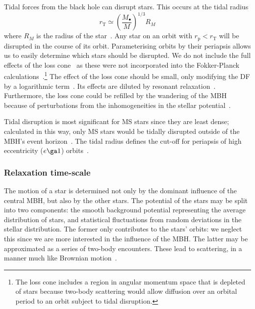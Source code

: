 \documentclass[useAMS,usedcolumn,usegraphicx,usenatbib]{mn2e}
\newcommand{\sub}[1]{\ensuremath{_\mathrm{#1}}}
\begin{document}
Tidal forces from the black hole can disrupt stars. This occurs at the tidal radius
\begin{equation}
r\sub{T} \simeq \left(\frac{M_\bullet}{M}\right)^{1/3}R_M
\label{eq:Tidal}
\end{equation}
where $R_M$ is the radius of the star~\citep{Hills1975, Rees1988, Kobayashi2004}. Any star on an orbit with $r\sub{p} < r\sub{T}$ will be disrupted in the course of its orbit. Parameterising orbits by their periapsis allows us to easily determine which stars should be disrupted. We do not include the full effects of the loss cone~\citep{Frank1976, Lightman1977, Cohn1978} as these were not incorporated into the Fokker-Planck calculations~\citep{Hopman2009}.\footnote{The loss cone includes a region in angular momentum space that is depleted of stars because two-body scattering would allow diffusion over an orbital period to an orbit subject to tidal disruption.} The effect of the loss cone should be small, only modifying the DF by a logarithmic term~\citep{Lightman1977, Bahcall1977, Cohn1978}. Its effects are diluted by resonant relaxation~\citep{Hopman2007,Toonen2009}. Furthermore, the loss cone could be refilled by the wandering of the MBH because of perturbations from the inhomogeneities in the stellar potential~\citep{Sigurdsson1997,Merritt2007}.

Tidal disruption is most significant for MS stars since they are least dense; calculated in this way, only MS stars would be tidally disrupted outside of the MBH's event horizon~\citep{Sigurdsson1997}. The tidal radius defines the cut-off for periapsis of high eccentricity ($e \ga 1$) orbits~\citep{Lightman1977}.

\subsubsection{Relaxation time-scale}\label{sec:Relax}

The motion of a star is determined not only by the dominant influence of the central MBH, but also by the other stars. The potential of the stars may be split into two components: the smooth background potential representing the average distribution of stars, and statistical fluctuations from random deviations in the stellar distribution. The former only contributes to the stars' orbits: we neglect this since we are more interested in the influence of the MBH. The latter may be approximated as a series of two-body encounters. These lead to scattering, in a manner much like Brownian motion~\citep{Bekenstein1992,Maoz1993,Nelson1999}.
\end{document}
